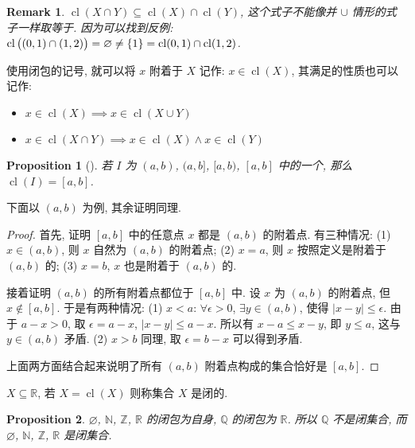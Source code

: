 \documentclass[UTF8]{ctexart}
\theoremstyle{mystyle}
\newtheorem{proposition}{Proposition}[section]
\theoremstyle{myremark}
\newtheorem*{remark}{Remark}
\theoremstyle{plain}
\newcommand{\R}{\mathbb R}
\newcommand{\Z}{\mathbb Z}
\newcommand{\N}{\mathbb N}
\newcommand{\Q}{\mathbb Q}
\DeclarePairedDelimiter\set{\{}{\}}
\DeclareMathOperator{\cl}{cl}
\begin{document}
\begin{remark}
    $ \cl(X \cap Y) \subseteq \cl(X) \cap \cl(Y) $, 这个式子不能像并 $ \cup $ 情形的式子一样取等于. 因为可以找到反例: $ \cl \big( (0, 1) \cap (1, 2) \big) = \varnothing \neq \set{1} = \cl(0, 1) \cap \cl(1, 2) $.
\end{remark}

使用闭包的记号, 就可以将 $ x $ 附着于 $ X $ 记作: $ x \in \cl(X) $, 其满足的性质也可以记作:
\begin{itemize}
    \item $ x \in \cl(X) \implies x \in \cl(X \cup Y) $
    \item $ x \in \cl(X \cap Y) \implies x \in \cl(X) \land x \in \cl(Y) $
\end{itemize}

\begin{proposition}[]
    若 $ I $ 为 $ (a, b) $, $ (a, b] $, $ [a, b) $, $ [a, b] $ 中的一个, 那么 $ \cl (I) = [a, b] $.
\end{proposition}

下面以 $ (a, b) $ 为例, 其余证明同理.
\begin{proof}
    首先, 证明 $ [a, b] $ 中的任意点 $ x $ 都是 $ (a, b) $ 的附着点. 有三种情况: (1) $ x \in (a, b) $, 则 $ x $ 自然为 $ (a, b) $ 的附着点; (2) $ x = a $, 则 $ x $ 按照定义是附着于 $ (a, b) $ 的; (3) $ x = b $, $ x $ 也是附着于 $ (a, b) $ 的.

    接着证明 $ (a, b) $ 的所有附着点都位于 $ [a, b] $ 中. 设 $ x $ 为 $ (a, b) $ 的附着点, 但 $ x \notin [a, b] $. 于是有两种情况: (1) $ x < a $: $ \forall \epsilon > 0 $, $ \exists y \in (a, b) $, 使得 $ |x - y| \leqslant \epsilon $. 由于 $ a - x > 0 $, 取 $ \epsilon = a - x $, $ |x - y| \leqslant a - x $. 所以有 $ x - a \leqslant x - y $, 即 $ y \leqslant a $, 这与 $ y \in (a, b) $ 矛盾. (2) $ x > b $ 同理, 取 $ \epsilon = b - x $ 可以得到矛盾.

    上面两方面结合起来说明了所有 $ (a, b) $ 附着点构成的集合恰好是 $ [a, b] $.
\end{proof}

\begin{definition}
    $ X \subseteq \R $, 若 $ X = \cl(X) $ 则称集合 $ X $ 是闭的.
\end{definition}

\begin{proposition}
    $ \varnothing $, $ \N $, $ \Z $, $ \R $ 的闭包为自身, $ \Q $ 的闭包为 $ \R $. 所以 $ \Q $ 不是闭集合, 而 $ \varnothing $, $ \N $, $ \Z $, $ \R $ 是闭集合.
\end{proposition}
\end{document}

